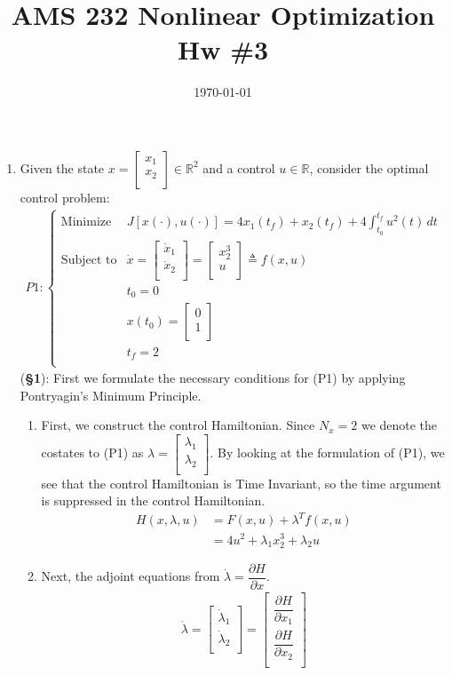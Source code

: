 \documentclass[10pt]{article}
\newcommand{\mat}[2][ccccccccccccccc]{\left [\!\!\begin{array}{#1} #2\\ \end{array} \!\!\right]}
\newcommand{\piece}[2][cll]{\left \{\begin{array}{#1} #2\\ \end{array} \right. }
\newcommand{\libzptrl}[2]{\dfrac{\partial #1}{\partial #2} }
\newcommand{\bbr}{\mathbb{R}}
\begin{document}
    \title{AMS 232 Nonlinear Optimization Hw \#3}
    \author{}
    \date{\today}
    \maketitle

\begin{enumerate}[leftmargin=*]
\item Given the state $x= \mat{x_1\\x_2}\in\bbr^2$ and a control $u\in\bbr$, consider the optimal control problem:
        \begin{align*}
            P1 : \piece{ \text{Minimize} & J[x(\cdot), u(\cdot)] = 4x_1(t_f)+x_2(t_f) + 4\int_{t_0}^{t_f}u^2(t)\,dt \\
                    \text{Subject to} & \dot x = \mat{\dot x_1 \\ \dot x_2} = \mat{x_2^3 \\ u}\triangleq f(x,u) \\
                     & t_0 = 0 \\
                     & x(t_0)=\mat{0\\1} \\
                     & t_f=2}
        \end{align*}
      (\textbf{\S1}): First we formulate the necessary conditions for (P1) by applying Pontryagin's Minimum Principle.
       \begin{enumerate}
         \item First, we construct the control Hamiltonian.  Since $N_x=2$ we denote the costates to (P1) as $\lambda=\mat{\lambda_1\\ \lambda_2}$.  By looking at the formulation of (P1), we see that the control Hamiltonian is Time Invariant, so the time argument is suppressed in the control Hamiltonian.
             \begin{align*}
                H(x, \lambda, u) &= F(x, u) + \lambda^Tf(x,u) \\
                    &= 4u^2 + \lambda_1x_2^3 + \lambda_2u
             \end{align*}
         \item Next, the adjoint equations from $\dot \lambda = \libzptrl{H}{x}$.
                \begin{align*}
                    \dot\lambda = \mat{\dot\lambda_1\\ \dot\lambda_2}
                                = \mat{ \libzptrl{H}{x_1} \\ \libzptrl{H}{x_2} }

\end{align*}
\end{enumerate}
\end{enumerate}
\end{document}
